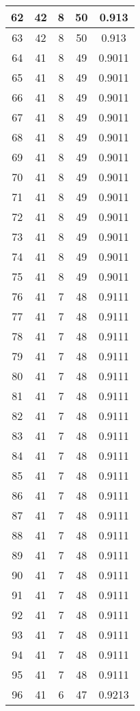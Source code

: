 \documentclass[letterpaper, 12pt]{article}
\begin{document}
\begin{longtable}{|c|c|c|c|c|}
\hline
62 & 42 & 8 & 50 & 0.913 \\
\hline
63 & 42 & 8 & 50 & 0.913 \\
\hline
64 & 41 & 8 & 49 & 0.9011 \\
\hline
65 & 41 & 8 & 49 & 0.9011 \\
\hline
66 & 41 & 8 & 49 & 0.9011 \\
\hline
67 & 41 & 8 & 49 & 0.9011 \\
\hline
68 & 41 & 8 & 49 & 0.9011 \\
\hline
69 & 41 & 8 & 49 & 0.9011 \\
\hline
70 & 41 & 8 & 49 & 0.9011 \\
\hline
71 & 41 & 8 & 49 & 0.9011 \\
\hline
72 & 41 & 8 & 49 & 0.9011 \\
\hline
73 & 41 & 8 & 49 & 0.9011 \\
\hline
74 & 41 & 8 & 49 & 0.9011 \\
\hline
75 & 41 & 8 & 49 & 0.9011 \\
\hline
76 & 41 & 7 & 48 & 0.9111 \\
\hline
77 & 41 & 7 & 48 & 0.9111 \\
\hline
78 & 41 & 7 & 48 & 0.9111 \\
\hline
79 & 41 & 7 & 48 & 0.9111 \\
\hline
80 & 41 & 7 & 48 & 0.9111 \\
\hline
81 & 41 & 7 & 48 & 0.9111 \\
\hline
82 & 41 & 7 & 48 & 0.9111 \\
\hline
83 & 41 & 7 & 48 & 0.9111 \\
\hline
84 & 41 & 7 & 48 & 0.9111 \\
\hline
85 & 41 & 7 & 48 & 0.9111 \\
\hline
86 & 41 & 7 & 48 & 0.9111 \\
\hline
87 & 41 & 7 & 48 & 0.9111 \\
\hline
88 & 41 & 7 & 48 & 0.9111 \\
\hline
89 & 41 & 7 & 48 & 0.9111 \\
\hline
90 & 41 & 7 & 48 & 0.9111 \\
\hline
91 & 41 & 7 & 48 & 0.9111 \\
\hline
92 & 41 & 7 & 48 & 0.9111 \\
\hline
93 & 41 & 7 & 48 & 0.9111 \\
\hline
94 & 41 & 7 & 48 & 0.9111 \\
\hline
95 & 41 & 7 & 48 & 0.9111 \\
\hline
96 & 41 & 6 & 47 & 0.9213 \\

\end{longtable}
\end{document}
